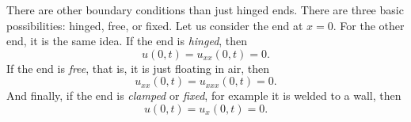 \documentclass{ximera}
\begin{document}
There are other boundary conditions than just hinged ends.  There are three basic possibilities: hinged, free, or fixed.  Let us consider the end at $x=0$.  For the other end, it is the same idea. If the end is \emph{hinged}, then
\begin{equation*}
    u(0,t) = u_{xx}(0,t) = 0 .
\end{equation*}
If the end is \emph{free}, that is, it is just floating in air, then
\begin{equation*}
    u_{xx}(0,t) = u_{xxx}(0,t) = 0 .
\end{equation*}
And finally, if the end is \emph{clamped} or \emph{fixed}, for example it is welded to a wall, then
\begin{equation*}
    u(0,t) = u_{x}(0,t) = 0 .
\end{equation*}
\end{document}
